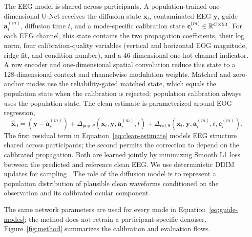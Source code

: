 The EEG model is shared across participants. A population-trained one-dimensional U-Net receives the diffusion state $\mathbf{x}_t$, contaminated EEG $\mathbf{y}$, guide $\mathbf{a}^{(m)}_i$, diffusion time $t$, and a mode-specific calibration state $\mathbf{c}^{(m)}_i\in\mathbb{R}^{C\times 53}$. For each EEG channel, this state contains the two propagation coefficients, their log norm, four calibration-quality variables (vertical and horizontal EOG magnitude, ridge fit, and condition number), and a 46-dimensional one-hot channel indicator. A row encoder and one-dimensional spatial convolution reduce this state to a 128-dimensional context and channelwise modulation weights. Matched and zero-anchor modes use the reliability-gated matched state, which equals the population state when the calibration is rejected; population calibration always uses the population state. The clean estimate is parameterized around EOG regression,
\begin{equation}
 \widehat{\mathbf{x}}_0=
 (\mathbf{y}-\mathbf{a}^{(m)}_i)
 +\Delta_{\mathrm{pop},\theta}(\mathbf{x}_t,\mathbf{y},\mathbf{a}^{(m)}_i,t)
 +\Delta_{\mathrm{cal},\theta}(\mathbf{x}_t,\mathbf{y},\mathbf{a}^{(m)}_i,t,
 \mathbf{c}^{(m)}_i).
 \label{eq:clean-estimate}
\end{equation}
The first residual term in Equation~\ref{eq:clean-estimate} models EEG structure shared across participants; the second permits the correction to depend on the calibrated propagation. Both are learned jointly by minimizing Smooth L1 loss between the predicted and reference clean EEG. We use deterministic DDIM updates for sampling \cite{song2020ddim}. The role of the diffusion model is to represent a population distribution of plausible clean waveforms conditioned on the observation and its calibrated ocular component.

The same network parameters are used for every mode in Equation~\ref{eq:guide-modes}; the method does not retrain a participant-specific denoiser. Figure~\ref{fig:method} summarizes the calibration and evaluation flows.

